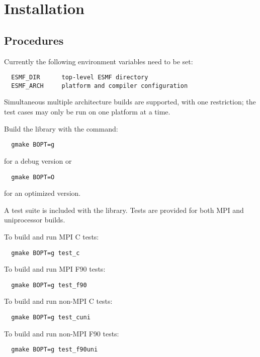 
\section{Installation}

\subsection{Procedures}

Currently the following environment variables need to be set:
\begin{verbatim}
  ESMF_DIR      top-level ESMF directory
  ESMF_ARCH     platform and compiler configuration
\end{verbatim}






Simultaneous multiple architecture builds are supported, with
one restriction; the test cases may only be run on one platform at a time. 

\smallskip

Build the library with the command:
\begin{verbatim}
  gmake BOPT=g  
\end{verbatim}
  for a debug version or
\begin{verbatim}
  gmake BOPT=O  
\end{verbatim}
  for an optimized version.

A test suite is included with the library.  Tests are provided for both MPI
and uniprocessor builds. 

\noindent To build and run MPI C tests:

\begin{verbatim}
  gmake BOPT=g test_c
\end{verbatim}

\noindent To build and run MPI F90 tests:
\begin{verbatim}
  gmake BOPT=g test_f90
\end{verbatim}

\noindent To build and run non-MPI C tests:
\begin{verbatim}
  gmake BOPT=g test_cuni
\end{verbatim}

\noindent To build and run non-MPI F90 tests:
\begin{verbatim}
  gmake BOPT=g test_f90uni
\end{verbatim}

